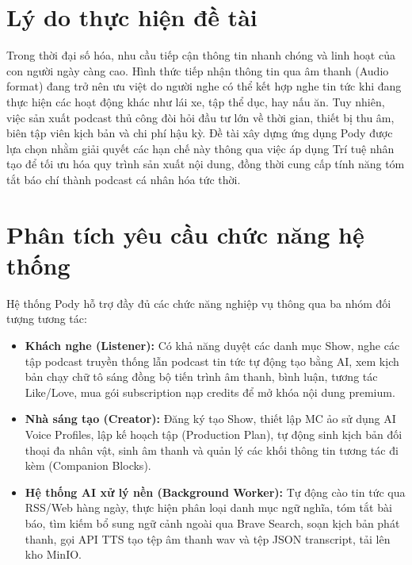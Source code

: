 \documentclass[12pt,a4paper]{report}
\begin{document}
\section{Lý do thực hiện đề tài}
Trong thời đại số hóa, nhu cầu tiếp cận thông tin nhanh chóng và linh hoạt của con người ngày càng cao. Hình thức tiếp nhận thông tin qua âm thanh (Audio format) đang trở nên ưu việt do người nghe có thể kết hợp nghe tin tức khi đang thực hiện các hoạt động khác như lái xe, tập thể dục, hay nấu ăn. Tuy nhiên, việc sản xuất podcast thủ công đòi hỏi đầu tư lớn về thời gian, thiết bị thu âm, biên tập viên kịch bản và chi phí hậu kỳ. Đề tài xây dựng ứng dụng Pody được lựa chọn nhằm giải quyết các hạn chế này thông qua việc áp dụng Trí tuệ nhân tạo để tối ưu hóa quy trình sản xuất nội dung, đồng thời cung cấp tính năng tóm tắt báo chí thành podcast cá nhân hóa tức thời.

\section{Phân tích yêu cầu chức năng hệ thống}
Hệ thống Pody hỗ trợ đầy đủ các chức năng nghiệp vụ thông qua ba nhóm đối tượng tương tác:
\begin{itemize}
    \item \textbf{Khách nghe (Listener):} Có khả năng duyệt các danh mục Show, nghe các tập podcast truyền thống lẫn podcast tin tức tự động tạo bằng AI, xem kịch bản chạy chữ tô sáng đồng bộ tiến trình âm thanh, bình luận, tương tác Like/Love, mua gói subscription nạp credits để mở khóa nội dung premium.
    \item \textbf{Nhà sáng tạo (Creator):} Đăng ký tạo Show, thiết lập MC ảo sử dụng AI Voice Profiles, lập kế hoạch tập (Production Plan), tự động sinh kịch bản đối thoại đa nhân vật, sinh âm thanh và quản lý các khối thông tin tương tác đi kèm (Companion Blocks).
    \item \textbf{Hệ thống AI xử lý nền (Background Worker):} Tự động cào tin tức qua RSS/Web hàng ngày, thực hiện phân loại danh mục ngữ nghĩa, tóm tắt bài báo, tìm kiếm bổ sung ngữ cảnh ngoài qua Brave Search, soạn kịch bản phát thanh, gọi API TTS tạo tệp âm thanh wav và tệp JSON transcript, tải lên kho MinIO.
\end{itemize}
\end{document}
